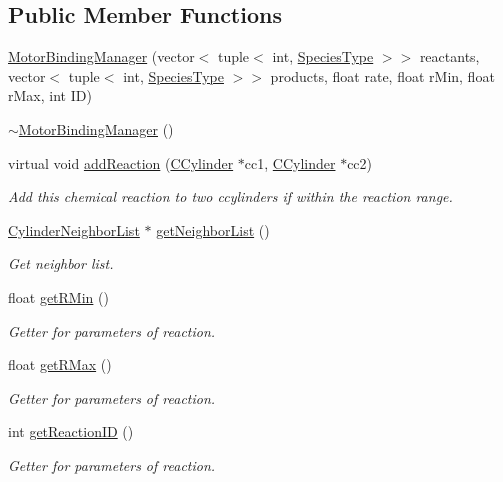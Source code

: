 \subsection*{Public Member Functions}
\begin{DoxyCompactItemize}
\item 
\hyperlink{classMotorBindingManager_a3303973f9014978791254c229da73610}{Motor\+Binding\+Manager} (vector$<$ tuple$<$ int, \hyperlink{Species_8h_a50651af47c56ea0e27235468d23542cf}{Species\+Type} $>$$>$ reactants, vector$<$ tuple$<$ int, \hyperlink{Species_8h_a50651af47c56ea0e27235468d23542cf}{Species\+Type} $>$$>$ products, float rate, float r\+Min, float r\+Max, int I\+D)
\item 
\hyperlink{classMotorBindingManager_a5a90a4f4ab35f33494d41d95d16fb8f0}{$\sim$\+Motor\+Binding\+Manager} ()
\item 
virtual void \hyperlink{classMotorBindingManager_a7620868b2035b311bd15b0fec7af1bd5}{add\+Reaction} (\hyperlink{classCCylinder}{C\+Cylinder} $\ast$cc1, \hyperlink{classCCylinder}{C\+Cylinder} $\ast$cc2)
\begin{DoxyCompactList}\small\item\em Add this chemical reaction to two ccylinders if within the reaction range. \end{DoxyCompactList}\item 
\hyperlink{classCylinderNeighborList}{Cylinder\+Neighbor\+List} $\ast$ \hyperlink{classCylinderNLContainer_afce343b3251cf0ed087cf5a62fb6aaee}{get\+Neighbor\+List} ()
\begin{DoxyCompactList}\small\item\em Get neighbor list. \end{DoxyCompactList}\end{DoxyCompactItemize}
{\bf }\par
\begin{DoxyCompactItemize}
\item 
float \hyperlink{classCrossFilamentRxnManager_aeb9207c18bb40c33d9c8fe99a006401d}{get\+R\+Min} ()
\begin{DoxyCompactList}\small\item\em Getter for parameters of reaction. \end{DoxyCompactList}\item 
float \hyperlink{classCrossFilamentRxnManager_a7fa04502185124176a72fb2f3965c698}{get\+R\+Max} ()
\begin{DoxyCompactList}\small\item\em Getter for parameters of reaction. \end{DoxyCompactList}\item 
int \hyperlink{classCrossFilamentRxnManager_aa5527049ea757ea2b22fca486d3bf08d}{get\+Reaction\+I\+D} ()
\begin{DoxyCompactList}\small\item\em Getter for parameters of reaction. \end{DoxyCompactList}\end{DoxyCompactItemize}

